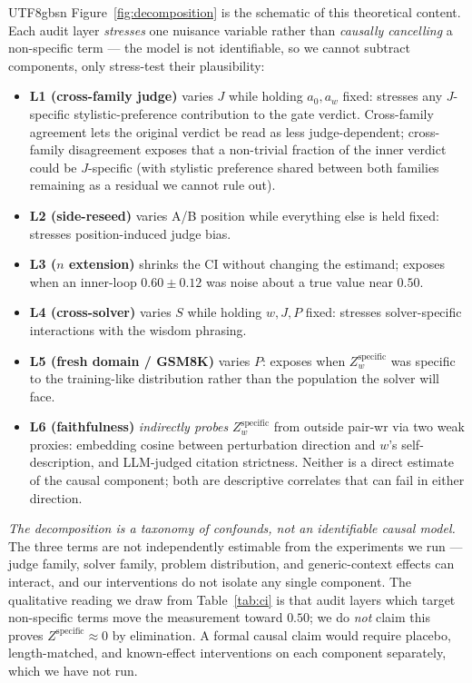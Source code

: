 \documentclass{article}
\begin{document}
\begin{CJK*}{UTF8}{gbsn}
Figure~\ref{fig:decomposition} is the schematic of this
theoretical content. Each audit layer \emph{stresses} one nuisance
variable rather than \emph{causally cancelling} a non-specific
term --- the model is not identifiable, so we cannot subtract
components, only stress-test their plausibility:
\begin{itemize}[leftmargin=*,topsep=2pt,itemsep=1pt]
  \item \textbf{L1 (cross-family judge)} varies \(J\) while
    holding \(a_0, a_w\) fixed: stresses any \(J\)-specific
    stylistic-preference contribution to the gate verdict.
    Cross-family agreement lets the original verdict be read as
    less judge-dependent; cross-family disagreement exposes that
    a non-trivial fraction of the inner verdict could be
    \(J\)-specific (with stylistic preference shared between
    both families remaining as a residual we cannot rule out).
  \item \textbf{L2 (side-reseed)} varies A/B position while
    everything else is held fixed: stresses position-induced
    judge bias.
  \item \textbf{L3 (\(n\) extension)} shrinks the CI without
    changing the estimand; exposes when an inner-loop
    \(0.60 \pm 0.12\) was noise about a true value
    near \(0.50\).
  \item \textbf{L4 (cross-solver)} varies \(S\) while holding
    \(w, J, P\) fixed: stresses solver-specific interactions
    with the wisdom phrasing.
  \item \textbf{L5 (fresh domain / GSM8K)} varies \(P\): exposes
    when \(Z_w^{\mathrm{specific}}\) was specific to the training-like
    distribution rather than the population the solver will face.
  \item \textbf{L6 (faithfulness)} \emph{indirectly probes}
    \(Z_w^{\mathrm{specific}}\) from outside pair-wr via two
    weak proxies: embedding cosine between perturbation direction
    and \(w\)'s self-description, and LLM-judged citation
    strictness. Neither is a direct estimate of the causal
    component; both are descriptive correlates that can fail in
    either direction.
\end{itemize}

\emph{The decomposition is a taxonomy of confounds, not an
identifiable causal model.} The three terms are not independently
estimable from the experiments we run --- judge family, solver
family, problem distribution, and generic-context effects can
interact, and our interventions do not isolate any single
component. The qualitative reading we draw from
Table~\ref{tab:ci} is that audit layers which target non-specific
terms move the measurement toward \(0.50\); we do \emph{not}
claim this proves \(Z^{\mathrm{specific}} \approx 0\) by
elimination. A formal causal claim would require placebo,
length-matched, and known-effect interventions on each component
separately, which we have not run.


\end{CJK*}
\end{document}
